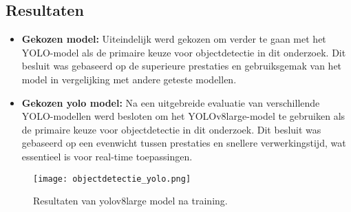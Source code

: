\subsection{Resultaten}
\begin{itemize}
  \item \textbf{Gekozen model:}   Uiteindelijk werd gekozen om verder te gaan met het YOLO-model als de primaire keuze voor objectdetectie in dit onderzoek. Dit besluit was gebaseerd op de superieure prestaties en gebruiksgemak van het model in vergelijking met andere geteste modellen.
  \item \textbf{Gekozen yolo model:} Na een uitgebreide evaluatie van verschillende YOLO-modellen werd besloten om het YOLOv8large-model te gebruiken als de primaire keuze voor objectdetectie in dit onderzoek. Dit besluit was gebaseerd op een evenwicht tussen prestaties en snellere verwerkingstijd, wat essentieel is voor real-time toepassingen.
\end{itemize}
\newline
\begin{figure}[H]
  \centering
  \texttt{[image: objectdetectie\_yolo.png]}
  \caption{Resultaten van yolov8large model na training.}
  \label{fig:yolo}
\end{figure}
\newline